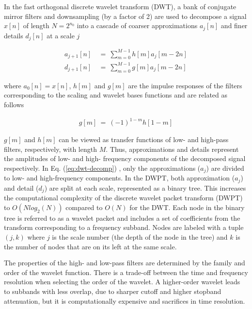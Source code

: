 \documentclass[preprint, linenumbers]{revtex4-2}
\newcommand{\eq}[1]{Eq. {(#1)} }
\begin{document}
In the fast orthogonal discrete wavelet transform (DWT), a bank of conjugate mirror filters and downsampling (by a factor of 2) are used to decompose a signal $x[n]$ of length $N=2^{n_0}$ into a cascade of coarser approximations $a_j[n]$ and finer details $d_j[n]$ at a scale $j$ \cite{mallat2009}

\begin{equation}
	\begin{aligned}  
		\label{eq:dwt-decomp}
		a_{j+1}[n] ~ & =~ \sum_{m=0}^{M-1} h[m]a_j[m-2n] \\
		d_{j+1}[n] ~ & =~ \sum_{m=0}^{M-1} g[m]a_j[m-2n] 
	\end{aligned}
\end{equation}


\noindent where $a_0[n] = x[n]$, $h[m]$ and $g[m]$ are the impulse responses of the filters corresponding to the scaling and wavelet bases functions and are related as follows

\begin{align}  
	\label{eq:dwt-filters}   
	g[m]~=~(-1)^{1-m} h[1-m] 
\end{align}

\noindent $g[m]$ and $h[m]$ can be viewed as transfer functions of low- and high-pass filters, respectively, with length $M$. Thus, approximations and details represent the amplitudes of low- and high- frequency components of the decomposed signal respectively. In \eq{\ref{eq:dwt-decomp}}, only the approximations ($a_j$) are divided to low- and high-frequency components. In the DWPT, both approximation ($a_j$) and detail ($d_j$) are split at each scale, represented as a binary tree. This increases the computational complexity of the discrete wavelet packet transform (DWPT) to $O(Nlog_2(N))$ compared to $O(N)$ for the DWT. Each node in the binary tree is referred to as a wavelet packet and includes a set of coefficients from the transform corresponding to a frequency subband. Nodes are labeled with a tuple $(j,k)$ where $j$ is the scale number (the depth of the node in the tree) and $k$ is the number of nodes that are on its left at the same scale. 

The properties of the high- and low-pass filters are determined by the family and order of the wavelet function. There is a trade-off between the time and frequency resolution when selecting the order of the wavelet. A higher-order wavelet leads to subbands with less overlap, due to sharper cutoff and higher stopband attenuation, but it is computationally expensive and sacrifices in time resolution. 
\end{document}
